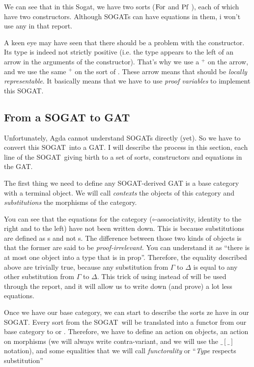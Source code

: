 \documentclass[10pt,a4paper]{article}
\begin{document}
			We can see that in this Sogat, we have two sorts ($\operatorname{For}$ and $\operatorname{Pf}\;$), each of which have two constructors. Although SOGATs can have equations in them, i won't use any in that report.
			
			A keen eye may have seen that there should be a problem with the \lam constructor. Its type is indeed not strictly positive (i.e. the type \Pf appears to the left of an arrow in the arguments of the constructor). That's why we use a ${}^+$ on the arrow, and we use the same ${}^+$ on the sort of \Pf. These arrow means that \Pf should be \emph{locally representable}. It basically means that we have to use \emph{proof variables} to implement this SOGAT.
		
		\subsection{From a SOGAT to GAT}
		
			
			Unfortunately, Agda cannot understand SOGATs directly (yet). So we have to convert this SOGAT into a GAT. I will describe the process in this section, each line of the SOGAT giving birth to a set of sorts, constructors and equations in the GAT.
			
			The first thing we need to define any SOGAT-derived GAT is a base category with a terminal object. We will call \emph{contexts} the objects of this category and \emph{substitutions} the morphisms of the category.
			
			You can see that the equations for the category ($\circ$-associativity, identity to the right and to the left) have not been written down. This is because substitutions are defined as s and not s. The difference between those two kinds of objects is that the former are said to be \emph{proof-irrelevant}. You can understand it as \enquote{there is at most one object into a type that is in prop}. Therefore, the equality described above are trivially true, because any substitution from $\Gamma$ to $\Delta$ is equal to any other substitution from $\Gamma$ to $\Delta$. This trick of using  instead of  will be used through the report, and it will allow us to write down (and prove) a lot less equations.
			
			\begin{tcolorbox}
			\end{tcolorbox}
		
			Once we have our base category, we can start to describe the sorts ze have in our SOGAT. Every sort from the SOGAT will be translated into a functor from our base category to  or . Therefore, we have to define an action on objects, an action on morphisms (we will always write contra-variant, and we will use the $\_[\_]$ notation), and some equalities that we will call \emph{functorality} or \enquote{\textit{Type} respects substitution}
			
\end{document}
